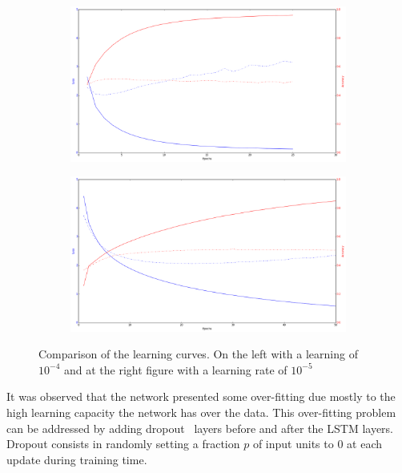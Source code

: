 \begin{figure}[H]
\centering
\begin{subfigure}[b]{.5\textwidth}
  \centering
  \includegraphics[width=1\linewidth]{img/methodology/training_bad}
\end{subfigure}%
\begin{subfigure}[b]{.5\textwidth}
  \centering
  \includegraphics[width=1\linewidth]{img/methodology/training_good}
\end{subfigure}
\caption{Comparison of the learning curves. On the left with a learning of $10^{-4}$ and at the right figure with a learning rate of $10^{-5}$}
\label{fig:training_curves_comparison}
\end{figure}

It was observed that the network presented some over-fitting due mostly to the high learning capacity the network has over the data. %
This over-fitting problem can be addressed by adding dropout~\cite{srivastava2014dropout} layers before and after the LSTM layers. Dropout consists in randomly setting a fraction $p$ of input units to 0 at each update during training time. %

